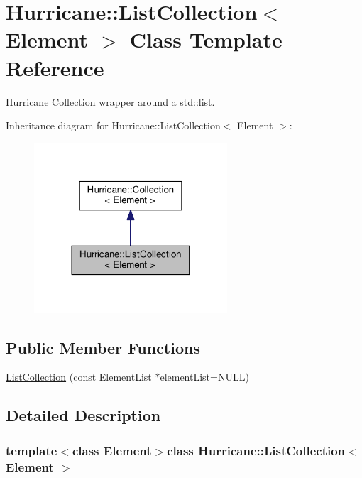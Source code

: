 \hypertarget{classHurricane_1_1ListCollection}{\section{Hurricane\-:\-:List\-Collection$<$ Element $>$ Class Template Reference}
\label{classHurricane_1_1ListCollection}
}


\hyperlink{namespaceHurricane}{Hurricane} \hyperlink{classHurricane_1_1Collection}{Collection} wrapper around a std\-::list.  




Inheritance diagram for Hurricane\-:\-:List\-Collection$<$ Element $>$\-:\nopagebreak
\begin{figure}[H]
\begin{center}
\leavevmode
\includegraphics[width=204pt]{classHurricane_1_1ListCollection__inherit__graph}
\end{center}
\end{figure}
\subsection*{Public Member Functions}
\begin{DoxyCompactItemize}
\item 
\hyperlink{classHurricane_1_1ListCollection_a11d0b27c9b01f16fe9ac9da091575e7c}{List\-Collection} (const Element\-List $\ast$element\-List=N\-U\-L\-L)
\end{DoxyCompactItemize}


\subsection{Detailed Description}
\subsubsection*{template$<$class Element$>$class Hurricane\-::\-List\-Collection$<$ Element $>$}


